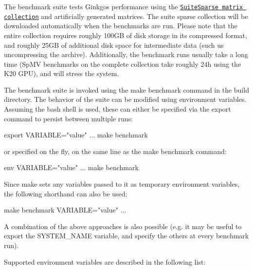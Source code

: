 The benchmark suite tests Ginkgo\textquotesingle{}s performance using the \href{https://sparse.tamu.edu/}{\tt Suite\+Sparse matrix collection} and artificially generated matrices. The suite sparse collection will be downloaded automatically when the benchmarks are run. Please note that the entire collection requires roughly 100\+GB of disk storage in its compressed format, and roughly 25\+GB of additional disk space for intermediate data (such us uncompressing the archive). Additionally, the benchmark runs usually take a long time (Sp\+MV benchmarks on the complete collection take roughly 24h using the K20 G\+PU), and will stress the system.

The benchmark suite is invoked using the {\ttfamily make benchmark} command in the build directory. The behavior of the suite can be modified using environment variables. Assuming the {\ttfamily bash} shell is used, these can either be specified via the {\ttfamily export} command to persist between multiple runs\+:


\begin{DoxyCode}
export VARIABLE="value"
...
make benchmark
\end{DoxyCode}


or specified on the fly, on the same line as the {\ttfamily make benchmark} command\+:


\begin{DoxyCode}
env VARIABLE="value" ... make benchmark
\end{DoxyCode}


Since {\ttfamily make} sets any variables passed to it as temporary environment variables, the following shorthand can also be used\+:


\begin{DoxyCode}
make benchmark VARIABLE="value" ...
\end{DoxyCode}


A combination of the above approaches is also possible (e.\+g. it may be useful to {\ttfamily export} the {\ttfamily S\+Y\+S\+T\+E\+M\+\_\+\+N\+A\+ME} variable, and specify the others at every benchmark run).

Supported environment variables are described in the following list\+:


